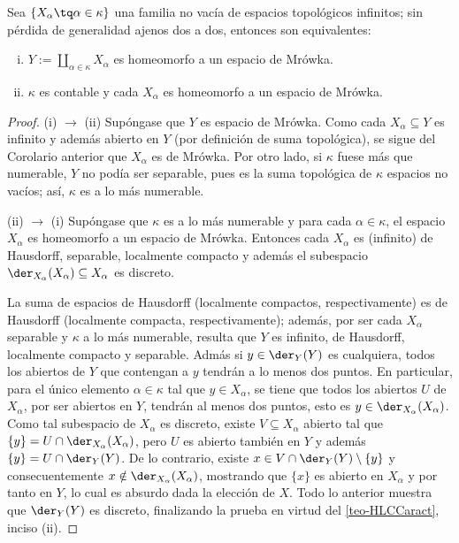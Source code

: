	\begin{corolario}
		Sea $\{X_\alpha \tq \alpha \in \kappa \}$ una familia no vacía de espacios topológicos infinitos; sin pérdida de generalidad ajenos dos a dos, entonces son equivalentes:
		\begin{enumerate}[i)]
			\item $\displaystyle Y:=\coprod_{\alpha \in \kappa} X_\alpha$ es homeomorfo a un espacio de Mrówka.
			\item $\kappa$ es contable y cada $X_\alpha$ es homeomorfo a un espacio de Mrówka.
		\end{enumerate}
	\end{corolario}
	\begin{proof} 
		(i) $\to$ (ii) Supóngase que $Y$ es espacio de Mrówka. Como cada $X_\alpha \subseteq Y$ es infinito y además abierto en $Y$ (por definición de suma topológica), se sigue del Corolario anterior que $X_\alpha$ es de Mrówka. Por otro lado, si $\kappa$ fuese más que numerable, $Y$ no podía ser separable, pues es la suma topológica de $\kappa$ espacios no vacíos; así, $\kappa$ es a lo más numerable.
	
		(ii) $\to$ (i) Supóngase que $\kappa$ es a lo más numerable y para cada $\alpha \in \kappa$, el espacio $X_\alpha$ es homeomorfo a un espacio de Mrówka. Entonces cada $X_\alpha$ es (infinito) de Hausdorff, separable, localmente compacto y además el subespacio $\der_{X_\alpha}(X_\alpha)\subseteq X_\alpha$ es discreto.
		
		La suma de espacios de Hausdorff (localmente compactos, respectivamente) es de Hausdorff (localmente compacta, respectivamente); además, por ser cada $X_\alpha$ separable y $\kappa$ a lo más numerable, resulta que $Y$ es infinito, de Hausdorff, localmente compacto y separable. Admás si $y \in \der_Y(Y)$ es cualquiera, todos los abiertos de $Y$ que contengan a $y$ tendrán a lo menos dos puntos. En particular, para el único elemento $\alpha \in \kappa$ tal que $y \in X_\alpha$, se tiene que todos los abiertos $U$ de $X_\alpha$, por ser abiertos en $Y$, tendrán al menos dos puntos, esto es $y \in \der_{X_\alpha}(X_\alpha)$. Como tal subespacio de $X_\alpha$ es discreto, existe $V \subseteq X_\alpha$ abierto tal que $\{y\}=U \cap \der_{X_\alpha}(X_\alpha)$, pero $U$ es abierto también en $Y$ y además $\{y\}=U \cap \der_Y(Y)$. De lo contrario, existe $x \in V \cap \der_Y(Y) \setminus \{y\}$ y consecuentemente $x \notin \der_{X_\alpha}(X_\alpha)$, mostrando que $\{x\}$ es abierto en $X_\alpha$ y por tanto en $Y$, lo cual es absurdo dada la elección de $X$. Todo lo anterior muestra que $\der_Y(Y)$ es discreto, finalizando la prueba en virtud del \autoref{teo-HLCCaract}, inciso (ii).
	\end{proof}
	
